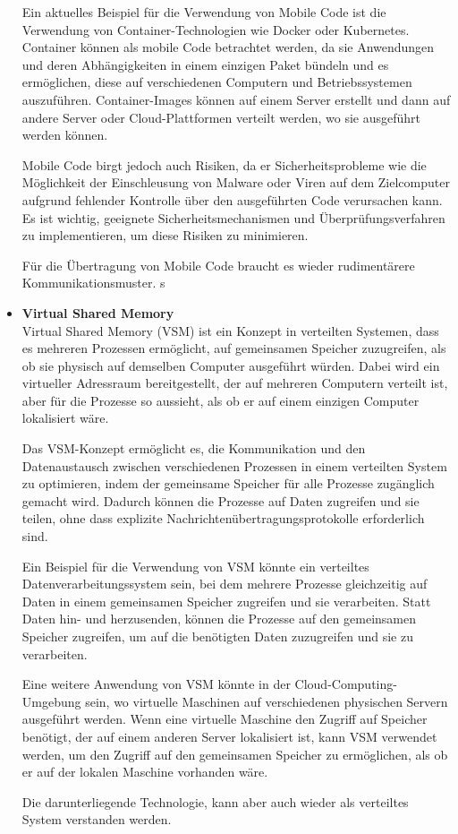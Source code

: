 \documentclass[../vs-script-first-v01.tex]{subfiles}
\begin{document}
\begin{itemize}
Ein aktuelles Beispiel für die Verwendung von Mobile Code ist die Verwendung von Container-Technologien wie Docker oder Kubernetes. Container können als mobile Code betrachtet werden, da sie Anwendungen und deren Abhängigkeiten in einem einzigen Paket bündeln und es ermöglichen, diese auf verschiedenen Computern und Betriebssystemen auszuführen. Container-Images können auf einem Server erstellt und dann auf andere Server oder Cloud-Plattformen verteilt werden, wo sie ausgeführt werden können.

Mobile Code birgt jedoch auch Risiken, da er Sicherheitsprobleme wie die Möglichkeit der Einschleusung von Malware oder Viren auf dem Zielcomputer aufgrund fehlender Kontrolle über den ausgeführten Code verursachen kann. Es ist wichtig, geeignete Sicherheitsmechanismen und Überprüfungsverfahren zu implementieren, um diese Risiken zu minimieren.

Für die Übertragung von Mobile Code braucht es wieder rudimentärere Kommunikationsmuster. s
\item \textbf{Virtual Shared Memory} \\
Virtual Shared Memory (VSM) ist ein Konzept in verteilten Systemen, dass es mehreren Prozessen ermöglicht, auf gemeinsamen Speicher zuzugreifen, als ob sie physisch auf demselben Computer ausgeführt würden. Dabei wird ein virtueller Adressraum bereitgestellt, der auf mehreren Computern verteilt ist, aber für die Prozesse so aussieht, als ob er auf einem einzigen Computer lokalisiert wäre.

Das VSM-Konzept ermöglicht es, die Kommunikation und den Datenaustausch zwischen verschiedenen Prozessen in einem verteilten System zu optimieren, indem der gemeinsame Speicher für alle Prozesse zugänglich gemacht wird. Dadurch können die Prozesse auf Daten zugreifen und sie teilen, ohne dass explizite Nachrichtenübertragungsprotokolle erforderlich sind.

Ein Beispiel für die Verwendung von VSM könnte ein verteiltes Datenverarbeitungssystem sein, bei dem mehrere Prozesse gleichzeitig auf Daten in einem gemeinsamen Speicher zugreifen und sie verarbeiten. Statt Daten hin- und herzusenden, können die Prozesse auf den gemeinsamen Speicher zugreifen, um auf die benötigten Daten zuzugreifen und sie zu verarbeiten.

Eine weitere Anwendung von VSM könnte in der Cloud-Computing-Umgebung sein, wo virtuelle Maschinen auf verschiedenen physischen Servern ausgeführt werden. Wenn eine virtuelle Maschine den Zugriff auf Speicher benötigt, der auf einem anderen Server lokalisiert ist, kann VSM verwendet werden, um den Zugriff auf den gemeinsamen Speicher zu ermöglichen, als ob er auf der lokalen Maschine vorhanden wäre.

Die darunterliegende Technologie, kann aber auch wieder als verteiltes System verstanden werden.
\end{itemize}
\end{document}
